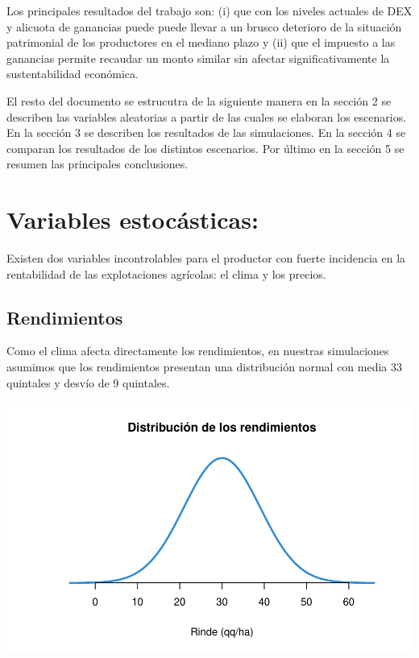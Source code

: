 \documentclass[
  12pt,
  spanish,
  10pt]{article}
\begin{document}
Los principales resultados del trabajo son: (i) que con los niveles
actuales de DEX y alicuota de ganancias puede puede llevar a un brusco
deterioro de la situación patrimonial de los productores en el mediano
plazo y (ii) que el impuesto a las ganancias permite recaudar un monto
similar sin afectar significativamente la sustentabilidad económica.

El resto del documento se estrucutra de la siguiente manera en la
sección 2 se describen las variables aleatorias a partir de las cuales
se elaboran los escenarios. En la sección 3 se describen los resultados
de las simulaciones. En la sección 4 se comparan los resultados de los
distintos escenarios. Por último en la sección 5 se resumen las
principales conclusiones.

\hypertarget{variables-estocuxe1sticas}{%
\section{Variables estocásticas:}\label{variables-estocuxe1sticas}}

Existen dos variables incontrolables para el productor con fuerte
incidencia en la rentabilidad de las explotaciones agrícolas: el clima y
los precios.

\hypertarget{rendimientos}{%
\subsection{Rendimientos}\label{rendimientos}}

Como el clima afecta directamente los rendimientos, en nuestras
simulaciones asumimos que los rendimientos presentan una distribución
normal con media 33 quintales y desvío de 9 quintales.

\includegraphics{simulacion_retenciones_bagging_files/figure-latex/unnamed-chunk-2-1.pdf}
\end{document}
